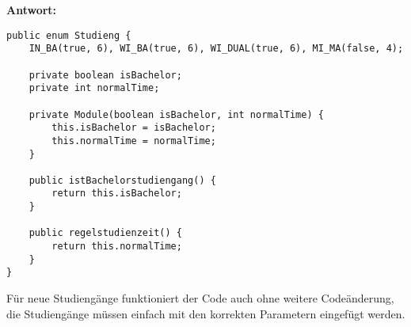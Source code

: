 \textbf{Antwort:}

\begin{lstlisting}
public enum Studieng {
    IN_BA(true, 6), WI_BA(true, 6), WI_DUAL(true, 6), MI_MA(false, 4);

    private boolean isBachelor;
    private int normalTime;

    private Module(boolean isBachelor, int normalTime) {
        this.isBachelor = isBachelor;
        this.normalTime = normalTime;
    }

    public istBachelorstudiengang() {
        return this.isBachelor;
    }

    public regelstudienzeit() {
        return this.normalTime;
    }
}
\end{lstlisting}

Für neue Studiengänge funktioniert der Code auch ohne weitere Codeänderung, die
Studiengänge müssen einfach mit den korrekten Parametern eingefügt werden.